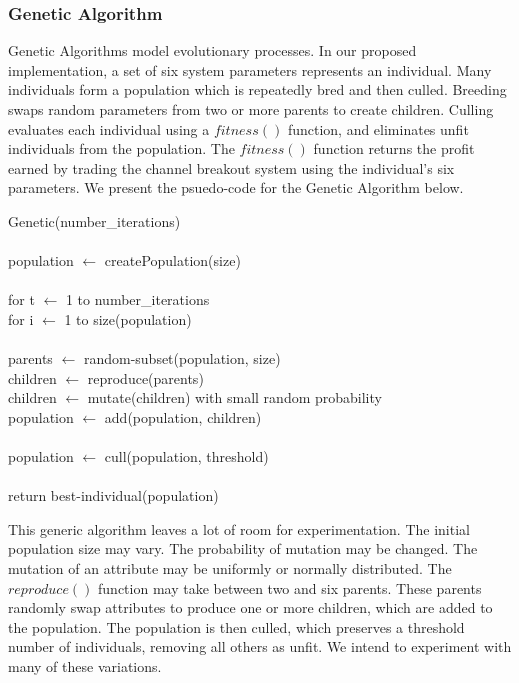 \documentclass[12pt]{article}
\begin{document}
\subsubsection{Genetic Algorithm}

Genetic Algorithms model evolutionary processes.  In our proposed
implementation, a set of six system parameters represents an individual.  Many
individuals form a population which is repeatedly bred and then culled.
Breeding swaps random parameters from two or more parents to create children.
Culling evaluates each individual using a $fitness()$ function, and eliminates
unfit individuals from the population.  The $fitness()$ function returns the
profit earned by trading the channel breakout system using the individual's six
parameters.  We present the psuedo-code for the Genetic Algorithm below.

\vspace{10pt}
\setlength{\parindent}{5mm}
\indent Genetic(number\_iterations)\\\\
\indent\indent population $\leftarrow$ createPopulation(size)\\\\
\indent \indent for t $\leftarrow$ 1 to number\_iterations\\
\indent \indent \indent for i $\leftarrow$ 1 to size(population)\\\\
\indent \indent \indent \indent parents $\leftarrow$ random-subset(population, size)\\
\indent \indent \indent \indent children $\leftarrow$ reproduce(parents)\\
\indent \indent \indent \indent children $\leftarrow$ mutate(children) with small random probability\\
\indent \indent \indent \indent population $\leftarrow$ add(population, children)\\\\
\indent \indent \indent population $\leftarrow$ cull(population, threshold)\\\\
\indent \indent return best-individual(population)\\
\setlength{\parindent}{0mm}

This generic algorithm leaves a lot of room for experimentation. The initial
population size may vary.  The probability of mutation may be changed.  The
mutation of an attribute may be uniformly or normally distributed.  The
$reproduce()$ function may take between two and six parents.  These parents
randomly swap attributes to produce one or more children, which are added to
the population.  The population is then culled, which preserves a threshold
number of individuals, removing all others as unfit. We intend to experiment
with many of these variations.
\end{document}
